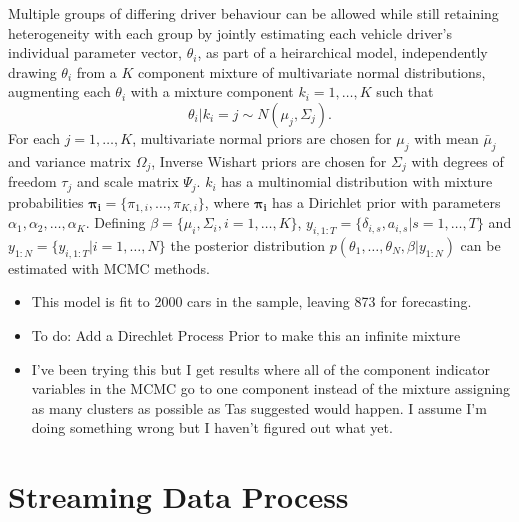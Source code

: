 \documentclass[12pt,a4paper]{article}\usepackage[]{graphicx}\usepackage[]{color}
\begin{document}
Multiple groups of differing driver behaviour can be allowed while still retaining heterogeneity with each group by jointly estimating each vehicle driver's individual parameter vector, $\theta_i$, as part of a heirarchical model, independently drawing $\theta_i$ from a $K$ component mixture of multivariate normal distributions, augmenting each $\theta_i$ with a mixture component $k_i = 1, \dots, K$ such that 
\begin{equation}
\theta_i | k_i = j \sim N(\mu_j, \Sigma_j).
\end{equation}
For each $j = 1, \dots, K$, multivariate normal priors are chosen for $\mu_j$ with mean $\bar{\mu}_j$ and variance matrix $\Omega_j$, Inverse Wishart priors are chosen for $\Sigma_j$ with degrees of freedom $\tau_j$ and scale matrix $\Psi_j$. $k_{i}$ has a multinomial distribution with mixture probabilities $\boldsymbol{\pi_i} = \{\pi_{1, i}, \dots, \pi_{K, i}\}$, where $\boldsymbol{\pi_i}$ has a Dirichlet prior with parameters $\alpha_1, \alpha_2, \dots, \alpha_K$. Defining $\beta = \{\mu_i, \Sigma_i, i = 1, \dots, K\}$, $y_{i, 1:T} = \{\delta_{i, s}, a_{i, s} | s = 1, \dots, T\}$ and $y_{1:N} = \{y_{i, 1:T} | i = 1, \dots, N\}$ the posterior distribution $p(\theta_1, \dots, \theta_N, \beta | y_{1:N})$ can be estimated with MCMC methods.


\begin{itemize}
\item This model is fit to 2000 cars in the sample, leaving 873 for forecasting.
\item To do: Add a Direchlet Process Prior to make this an infinite mixture
\item I've been trying this but I get results where all of the component indicator variables in the MCMC go to one component instead of the mixture assigning as many clusters as possible as Tas suggested would happen. I assume I'm doing something wrong but I haven't figured out what yet.
\end{itemize}

\section{Streaming Data Process}
\end{document}
